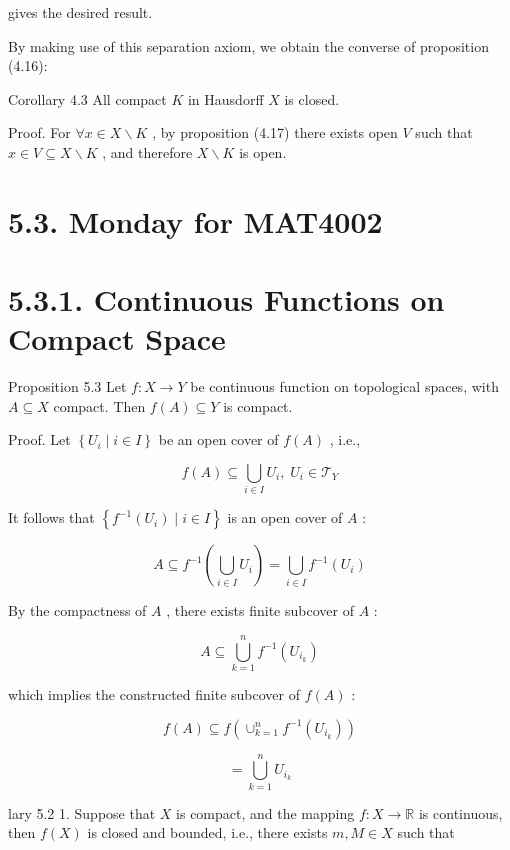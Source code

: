 gives the desired result.

By making use of this separation axiom, we obtain the converse of proposition (4.16):

Corollary 4.3 All compact \(K\) in Hausdorff \(X\) is closed.

Proof. For \(\forall x \in  X \smallsetminus  K\) , by proposition (4.17) there exists open \(V\) such that \(x \in  V \subseteq  X \smallsetminus  K\) , and therefore \(X \smallsetminus  K\) is open.

\section*{5.3. Monday for MAT4002}

\section*{5.3.1. Continuous Functions on Compact Space}

Proposition 5.3 Let \(f : X \rightarrow  Y\) be continuous function on topological spaces, with \(A \subseteq  X\) compact. Then \(f\left( A\right)  \subseteq  Y\) is compact.

Proof. Let \(\left\{  {{U}_{i} \mid  i \in  I}\right\}\) be an open cover of \(f\left( A\right)\) , i.e.,

\[
f\left( A\right)  \subseteq  \mathop{\bigcup }\limits_{{i \in  I}}{U}_{i},\;{U}_{i} \in  {\mathcal{T}}_{Y}
\]

It follows that \(\left\{  {{f}^{-1}\left( {U}_{i}\right)  \mid  i \in  I}\right\}\) is an open cover of \(A\) :

\[
A \subseteq  {f}^{-1}\left( {\mathop{\bigcup }\limits_{{i \in  I}}{U}_{i}}\right)  = \mathop{\bigcup }\limits_{{i \in  I}}{f}^{-1}\left( {U}_{i}\right)
\]

By the compactness of \(A\) , there exists finite subcover of \(A\) :

\[
A \subseteq  \mathop{\bigcup }\limits_{{k = 1}}^{n}{f}^{-1}\left( {U}_{{i}_{k}}\right)
\]

which implies the constructed finite subcover of \(f\left( A\right)\) :

\[
f\left( A\right)  \subseteq  f\left( {{ \cup  }_{k = 1}^{n}{f}^{-1}\left( {U}_{{i}_{k}}\right) }\right)
\]

\[
= {\bigcup }_{k = 1}^{n}{U}_{{i}_{k}}
\]

lary 5.2 1. Suppose that \(X\) is compact, and the mapping \(f : X \rightarrow  \mathbb{R}\) is continuous, then \(f\left( X\right)\) is closed and bounded, i.e., there exists \(m,M \in  X\) such that

